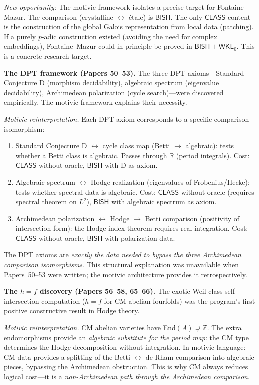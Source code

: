 \documentclass[11pt,a4paper]{article}
\theoremstyle{plain}
\theoremstyle{definition}
\newcommand{\BISH}{\textsf{BISH}}
\newcommand{\WKL}{\textsf{WKL}_0}
\newcommand{\CLASS}{\textsf{CLASS}}
\newcommand{\Z}{\mathbb{Z}}
\newcommand{\R}{\mathbb{R}}
\begin{document}
\emph{New opportunity:} The motivic framework isolates a precise target for Fontaine--Mazur. The comparison (crystalline $\leftrightarrow$ \'etale) is $\BISH$. The only $\CLASS$ content is the construction of the global Galois representation from local data (patching). If a purely $p$-adic construction existed (avoiding the need for complex embeddings), Fontaine--Mazur could in principle be proved in $\BISH + \WKL$. This is a concrete research target.

\medskip
\noindent\textbf{The DPT framework (Papers 50--53).} The three DPT axioms---Standard Conjecture D (morphism decidability), algebraic spectrum (eigenvalue decidability), Archimedean polarization (cycle search)---were discovered empirically. The motivic framework explains their necessity.

\emph{Motivic reinterpretation.} Each DPT axiom corresponds to a specific comparison isomorphism:
\begin{enumerate}[label=(\roman*)]
\item Standard Conjecture D $\leftrightarrow$ cycle class map (Betti $\to$ algebraic): tests whether a Betti class is algebraic. Passes through $\R$ (period integrals). Cost: $\CLASS$ without oracle, $\BISH$ with D as axiom.

\item Algebraic spectrum $\leftrightarrow$ Hodge realization (eigenvalues of Frobenius/Hecke): tests whether spectral data is algebraic. Cost: $\CLASS$ without oracle (requires spectral theorem on $L^2$), $\BISH$ with algebraic spectrum as axiom.

\item Archimedean polarization $\leftrightarrow$ Hodge $\to$ Betti comparison (positivity of intersection form): the Hodge index theorem requires real integration. Cost: $\CLASS$ without oracle, $\BISH$ with polarization data.
\end{enumerate}

The DPT axioms are \emph{exactly the data needed to bypass the three Archimedean comparison isomorphisms}. This structural explanation was unavailable when Papers~50--53 were written; the motivic architecture provides it retrospectively.

\medskip
\noindent\textbf{The $h = f$ discovery (Papers 56--58, 65--66).} The exotic Weil class self-intersection computation ($h = f$ for CM abelian fourfolds) was the program's first positive constructive result in Hodge theory.

\emph{Motivic reinterpretation.} CM abelian varieties have End$(A) \supsetneq \Z$. The extra endomorphisms provide an \emph{algebraic substitute for the period map}: the CM type determines the Hodge decomposition without integration. In motivic language: CM data provides a splitting of the Betti $\leftrightarrow$ de Rham comparison into algebraic pieces, bypassing the Archimedean obstruction. This is why CM always reduces logical cost---it is a \emph{non-Archimedean path through the Archimedean comparison}.
\end{document}
